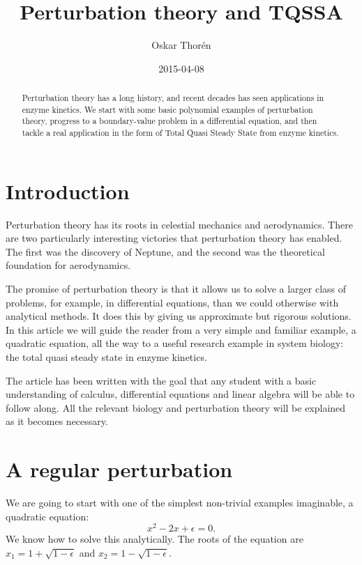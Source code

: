 \documentclass[12pt]{article}
\title{Perturbation theory and TQSSA}
\author{Oskar Thor\'{e}n}
\date{2015-04-08}
\begin{document}
\nocite{*} %
\maketitle

\begin{abstract}
  Perturbation theory has a long history, and recent decades has seen
  applications in enzyme kinetics. We start with some basic polynomial
  examples of perturbation theory, progress to a boundary-value
  problem in a differential equation, and then tackle a real
  application in the form of Total Quasi Steady State from enzyme
  kinetics.
\end{abstract}

\clearpage
\tableofcontents
\clearpage

\section{Introduction}

Perturbation theory has its roots in celestial mechanics and
aerodynamics. There are two particularly interesting victories that
perturbation theory has enabled. The first was the discovery of
Neptune, and the second was the theoretical foundation for
aerodynamics.

The promise of perturbation theory is that it allows us to solve a
larger class of problems, for example, in differential equations, than
we could otherwise with analytical methods. It does this by giving us
approximate but rigorous solutions. In this article we will guide
the reader from a very simple and familiar example, a quadratic
equation, all the way to a useful research example in system biology:
the total quasi steady state in enzyme kinetics.

The article has been written with the goal that any student with a
basic understanding of calculus, differential equations and linear
algebra will be able to follow along. All the relevant biology and
perturbation theory will be explained as it becomes necessary.

\newpage
\section{A regular perturbation}

We are going to start with one of the simplest non-trivial examples
imaginable, a quadratic equation:
\begin{equation}
x^2 - 2x + \epsilon = 0.
\end{equation}
We know how to solve this analytically. The roots of the equation are
$x_1 = 1 + \sqrt{1 - \epsilon}$ and $x_2 = 1 - \sqrt{1 - \epsilon}$.
\end{document}
